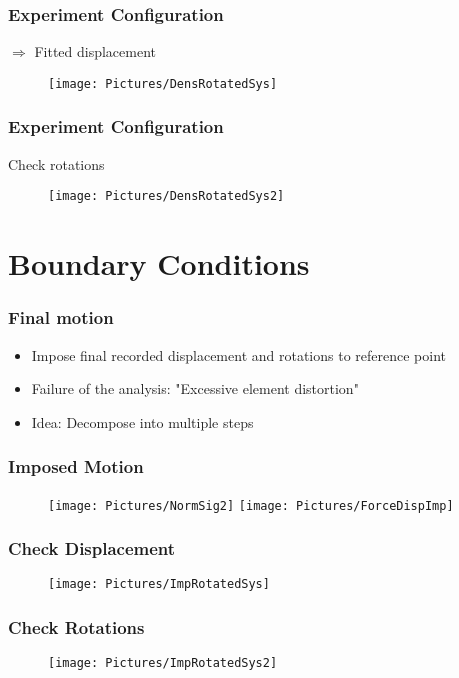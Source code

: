 \documentclass[xcolor=table,11pt]{beamer}
\begin{document}
	\begin{frame}
		\frametitle{Experiment Configuration}
		$\Rightarrow$ Fitted displacement
		\begin{figure}
			\texttt{[image: Pictures/DensRotatedSys]}
		\end{figure}
	\end{frame}

	\begin{frame}
		\frametitle{Experiment Configuration}
		Check rotations\\
		\begin{figure}
			\texttt{[image: Pictures/DensRotatedSys2]}
		\end{figure}
	\end{frame}

	\section{Boundary Conditions}
	
	\begin{frame}
		\frametitle{Final motion}
		\begin{itemize}
			\item Impose final recorded displacement and rotations to reference point
			\item Failure of the analysis: "Excessive element distortion"
			\item Idea: Decompose into multiple steps
		\end{itemize}
	\end{frame}

	\begin{frame}
		\frametitle{Imposed Motion}
		\begin{figure}
			\texttt{[image: Pictures/NormSig2]}		\texttt{[image: Pictures/ForceDispImp]}
		\end{figure}
	\end{frame}

	\begin{frame}
		\frametitle{Check Displacement}
		\begin{figure}
			\texttt{[image: Pictures/ImpRotatedSys]}
		\end{figure}
	\end{frame}
	
	\begin{frame}
		\frametitle{Check Rotations}
		\begin{figure}
			\texttt{[image: Pictures/ImpRotatedSys2]}
		\end{figure}
	\end{frame}
	
\end{document}
